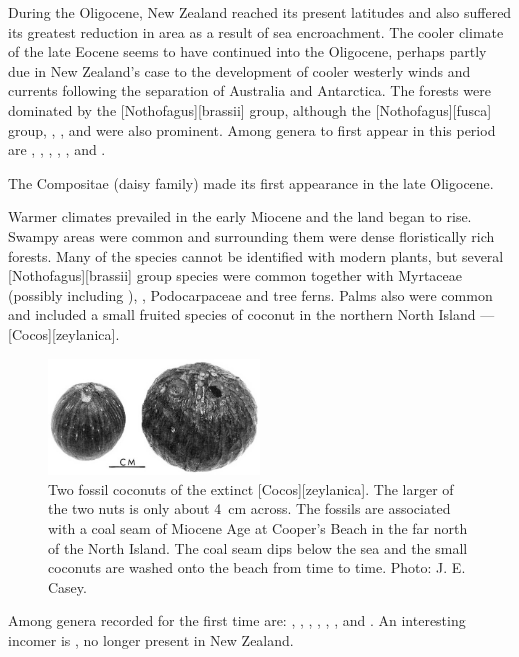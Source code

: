 During the Oligocene, New Zealand reached its present latitudes and also suffered its greatest reduction in area as a result of sea encroachment.
The cooler climate of the late Eocene seems to have continued into the Oligocene, perhaps partly due in New Zealand's case to the development of cooler westerly winds and currents following the separation of Australia and Antarctica.
The forests were dominated by the [Nothofagus][brassii] group, although the [Nothofagus][fusca] group, , ,  and  were also prominent.
Among genera to first appear in this period are , , , , ,  and .

The Compositae (daisy family) made its first appearance in the late Oligocene.

Warmer climates prevailed in the early Miocene and the land began to rise.
Swampy areas were common and surrounding them were dense floristically rich forests.
Many of the species cannot be identified with modern plants, but several [Nothofagus][brassii] group species were common together with Myrtaceae (possibly including ), , Podocarpaceae and tree ferns.
Palms also were common and included a small fruited species of coconut in the northern North Island --- [Cocos][zeylanica].
\begin{figure}
	\includegraphics[width=0.5\textwidth]{graphics/figure124fossil-coconuts.jpg}
	\centering
	\caption[Two fossil coconuts]{Two fossil coconuts of the extinct [Cocos][zeylanica].
	The larger of the two nuts is only about \SI{4}{\centi\metre} across.
	The fossils are associated with a coal seam of Miocene Age at Cooper's Beach in the far north of the North Island.
	The coal seam dips below the sea and the small coconuts are washed onto the beach from time to time.
	Photo: J. E. Casey.}%
	\label{fig:124fossil-coconuts}
\end{figure}
Among genera recorded for the first time are: , , , , , ,  and .
An interesting incomer is , no longer present in New Zealand.

